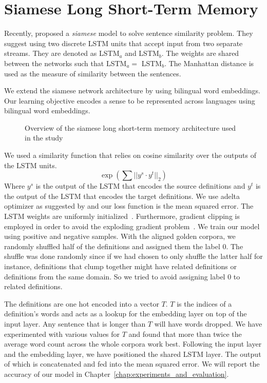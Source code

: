 \section{Siamese Long Short-Term Memory}%
\label{sec:siamese_long_short_term_memory}

Recently, \textcite{mueller_siamese_2016} proposed a \emph{siamese} model to solve sentence similarity problem.
They suggest using two discrete LSTM units that accept input from two separate streams.
They are denoted as LSTM$_a$ and LSTM$_b$.
The weights are shared between the networks such that LSTM$_a = $ LSTM$_b$.
The Manhattan distance is used as the measure of similarity between the sentences.

We extend the siamese network architecture by using bilingual word embeddings.
Our learning objective encodes a sense to be represented across languages using bilingual word embeddings.


\begin{figure}[htbp]
    \centering
    \caption{Overview of the siamese long short-term memory architecture used in the study}%
    \label{fig:lstm_model_overview}
\end{figure}

We used a similarity function that relies on cosine similarity over the outputs of the LSTM units.
\begin{equation}
    \exp(\sum{||y^{s}\cdot y^{t}}||_2)
\end{equation}
Where $y^{s}$ is the output of the LSTM that encodes the source definitions and $y^{t}$ is the output of the LSTM that encodes the target definitions.
We use adelta optimizer as suggested by \textcite{zeiler_adadelta_2012} and our loss function is the mean squared error.
The LSTM weights are uniformly initialized~\cite{glorot_understanding_2010}.
Furthermore, gradient clipping is employed in order to avoid the exploding gradient problem~\cite{pascanu_difficulty_2012}.
We train our model using positive and negative samples.
With the aligned golden corpora, we randomly shuffled half of the definitions and assigned them the label 0.
The shuffle was done randomly since if we had chosen to only shuffle the latter half for instance, definitions that clump together might have related definitions or definitions from the same domain.
So we tried to avoid assigning label 0 to related definitions.

The definitions are one hot encoded into a vector $T$.
$T$ is the indices of a definition's words and acts as a lookup for the embedding layer on top of the input layer.
Any sentence that is longer than $T$ will have words dropped.
We have experimented with various values for $T$ and found that more than twice the average word count across the whole corpora work best.
Following the input layer and the embedding layer, we have positioned the shared LSTM layer.
The output of which is concatenated and fed into the mean squared error.
We will report the accuracy of our model in Chapter~\ref{chap:experiments_and_evaluation}.

